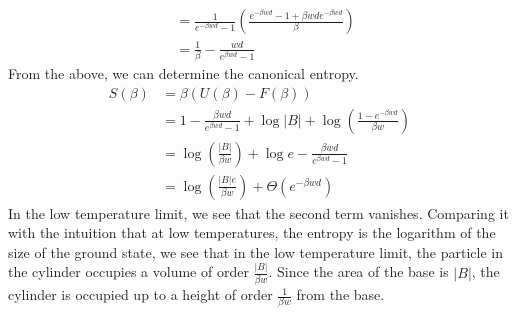 \documentclass[letterpaper,english,12pt]{article}
\begin{document}
\begin{exmp}[Cylinder]
\begin{align}
	&= \frac{1}{e^{-\beta wd} - 1} \left( \frac{e^{-\beta wd} - 1 + \beta wd e^{-\beta wd}}{\beta} \right) \nonumber \\
	&= \frac{1}{\beta} - \frac{wd}{e^{\beta wd} - 1}
\end{align}
From the above, we can determine the canonical entropy.
\begin{align}
S(\beta) &= \beta (U(\beta) - F(\beta)) \nonumber \\
	&= 1 - \frac{\beta wd}{e^{\beta wd} - 1} + \log |B| + \log \left( \frac{1 - e^{- \beta wd}}{\beta w} \right) \nonumber \\
	&= \log \left( \frac{|B|}{\beta w} \right) + \log e - \frac{\beta wd}{e^{\beta wd} - 1} \nonumber \\
	&= \log \left( \frac{|B|e}{\beta w} \right) + \Theta(e^{- \beta wd})
\end{align}
In the low temperature limit, we see that the second term vanishes. Comparing it with the intuition that at low temperatures, the entropy is the logarithm of the size of the ground state, we see that in the low temperature limit, the particle in the cylinder occupies a volume of order $\frac{|B|}{\beta w}$. Since the area of the base is $|B|$, the cylinder is occupied up to a height of order $\frac{1}{\beta w}$ from the base.
\end{exmp}
\end{document}
